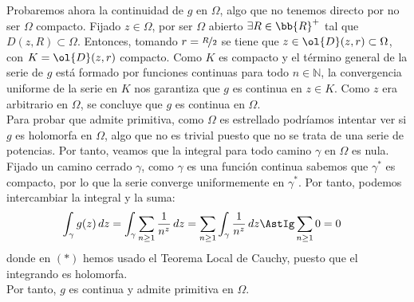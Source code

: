 \documentclass[12pt]{article}
\begin{document}
\begin{ejercicio}[3.5 puntos]
\begin{itemize}
            Probaremos ahora la continuidad de $g$ en $\Omega$, algo que no tenemos directo por no ser $\Omega$ compacto. Fijado $z\in \Omega$, por ser $\Omega$ abierto $\exists R\in \bb{R}^+$ tal que $D(z,R)\subset \Omega$. Entonces, tomando $r=\nicefrac{R}{2}$ se tiene que $z\in \ol{D}(z,r)\subset \Omega$, con $K=\ol{D}(z,r)$ compacto. Como $K$ es compacto y el término general de la serie de $g$ está formado por funciones continuas para todo $n\in \mathbb{N}$, la convergencia uniforme de la serie en $K$ nos garantiza que $g$ es continua en $z\in K$. Como $z$ era arbitrario en $\Omega$, se concluye que $g$ es continua en $\Omega$.\\

            Para probar que admite primitiva, como $\Omega$ es estrellado podríamos intentar ver si $g$ es holomorfa en $\Omega$, algo que no es trivial puesto que no se trata de una serie de potencias. Por tanto, veamos que la integral para todo camino $\gamma$ en $\Omega$ es nula. Fijado un camino cerrado $\gamma$, como $\gamma$ es una función continua sabemos que $\gamma^*$ es compacto, por lo que la serie converge uniformemente en $\gamma^*$. Por tanto, podemos intercambiar la integral y la suma:
            \begin{align*}
                \int_{\gamma} g(z) \, dz &= \int_{\gamma} \sum_{n\geq 1} \frac{1}{n^z} \, dz = \sum_{n\geq 1} \int_{\gamma} \frac{1}{n^z} \, dz
                \AstIg \sum_{n\geq 1} 0 = 0
            \end{align*}
            donde en $(\ast)$ hemos usado el Teorema Local de Cauchy, puesto que el integrando es holomorfa.\\

            Por tanto, $g$ es continua y admite primitiva en $\Omega$.
        \end{itemize}

    \end{ejercicio}
\end{document}
